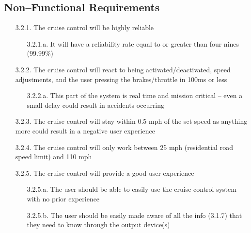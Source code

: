 \documentclass{article}
\begin{document}
	\subsection{Non--Functional Requirements}
	\begin{enumerate}
		\item[3.2.1.] The cruise control will be highly reliable
		\begin{enumerate}
			\item[3.2.1.a.] It will have a reliability rate equal to or greater than four nines (99.99\%)
		\end{enumerate}
		\item[3.2.2.] The cruise control will react to being activated/deactivated, speed adjustments, and the user pressing the brakes/throttle in 100ms or less
		\begin{enumerate}
			\item[3.2.2.a.] This part of the system is real time and mission critical -- even a small delay could result in accidents occurring 
		\end{enumerate}
		\item[3.2.3.] The cruise control will stay within 0.5 mph of the set speed as anything more could result in a negative user experience
		\item[3.2.4.] The cruise control will only work between 25 mph (residential road speed limit) and 110 mph
		\item[3.2.5.] The cruise control will provide a good user experience
		\begin{enumerate}
			\item[3.2.5.a.] The user should be able to easily use the cruise control system with no prior experience
			\item[3.2.5.b.] The user should be easily made aware of all the info (3.1.7) that they need to know through the output device(s)
		\end{enumerate}
	\end{enumerate}
	
\end{document}
